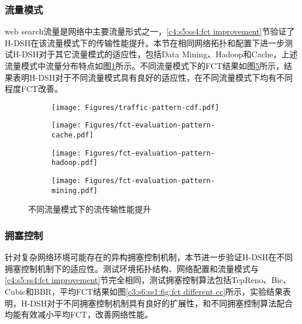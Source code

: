 \subsubsection{流量模式}

web search流量是网络中主要流量形式之一\cite{SIGCOMM10DCTCP}，\ref{c4:s5:ss4:fct improvement}节验证了H-DSH在该流量模式下的传输性能提升。本节在相同网络拓扑和配置下进一步测试H-DSH对于其它流量模式的适应性，包括Data Mining\cite{SIGCOMM09VL2}、Hadoop\cite{SIGCOMM15FB}和Cache\cite{SIGCOMM15FB}，上述流量模式中流量分布特点如图\ref{c3:s6:ss1:fig:sub1:traffic pattern cdf}所示。不同流量模式下的FCT结果如图\ref{c3:s6:ss1:fig:fct different pattern}所示，结果表明H-DSH对于不同流量模式具有良好的适应性，在不同流量模式下均有不同程度FCT改善。

\begin{figure}[H]
  \begin{subfigure}[b]{0.49\linewidth}
      \centering
      \texttt{[image: Figures/traffic-pattern-cdf.pdf]}
      \label{c3:s6:ss1:fig:sub1:traffic pattern cdf}
  \end{subfigure}
  \begin{subfigure}[b]{0.49\linewidth}
      \centering
      \texttt{[image: Figures/fct-evaluation-pattern-cache.pdf]}
      \label{c3:s6:ss1:fig:sub1:fct cache}
  \end{subfigure}
  \begin{subfigure}[b]{0.49\linewidth}
    \centering
    \texttt{[image: Figures/fct-evaluation-pattern-hadoop.pdf]}
    \label{c3:s6:ss1:fig:sub1:fct hadoop}
  \end{subfigure}
  \begin{subfigure}[b]{0.49\linewidth}
    \centering
    \texttt{[image: Figures/fct-evaluation-pattern-mining.pdf]}
    \label{c3:s6:ss1:fig:sub1:fct mining}
  \end{subfigure}  
  \caption{不同流量模式下的流传输性能提升}
  \label{c3:s6:ss1:fig:fct different pattern}
\end{figure}

\subsubsection{拥塞控制}

针对复杂网络环境可能存在的异构拥塞控制机制，本节进一步验证H-DSH在不同拥塞控制机制下的适应性。测试环境拓扑结构、网络配置和流量模式与\ref{c4:s5:ss4:fct improvement}节完全相同，测试拥塞控制算法包括TcpReno、Bic、Cubic和BBR，平均FCT结果如图\ref{c3:s6:ss1:fig:fct different cc}所示，实验结果表明，H-DSH对于不同拥塞控制机制具有良好的扩展性，和不同拥塞控制算法配合均能有效减小平均FCT，改善网络性能。

